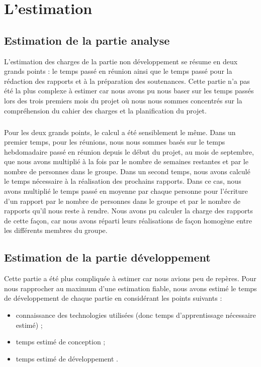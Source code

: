 
\chapter{L'estimation}

\section{Estimation de la partie analyse}

L’estimation des charges de la partie non développement se résume en deux grands points : le temps passé en réunion ainsi que le temps passé pour la rédaction des rapports et à la préparation des soutenances. Cette partie n’a pas été la plus complexe à estimer car nous avons pu nous baser sur les temps passés lors des trois premiers mois du projet où nous nous sommes concentrés sur la compréhension du cahier des charges et la planification du projet.

\paragraph{}

Pour les deux grands points, le calcul a été sensiblement le même. Dans un premier temps, pour les réunions, nous nous sommes basés sur le temps hebdomadaire passé en réunion depuis le début du projet, au mois de septembre, que nous avons multiplié à la fois par le nombre de semaines restantes et par le nombre de personnes dans le groupe. Dans un  second temps, nous avons calculé le temps nécessaire à la réalisation des prochains rapports. Dans ce cas, nous avons multiplié le temps passé en moyenne par chaque personne pour l’écriture d’un rapport par le nombre de personnes dans le groupe et par le nombre de rapports qu’il nous reste à rendre. Nous avons pu calculer la charge des rapports de cette façon, car nous avons réparti leurs réalisations de façon homogène entre les différents membres du groupe.

\section{Estimation de la partie développement}

Cette partie a été plus compliquée à estimer car nous avions peu de repères. Pour nous rapprocher au maximum d’une estimation fiable, nous avons estimé le temps de développement de chaque partie en considérant les points suivants : 

\begin{itemize}
\item connaissance des technologies utilisées (donc temps d’apprentissage nécessaire estimé) ;
\item temps estimé de conception ;
\item temps estimé de développement .
\end{itemize}

